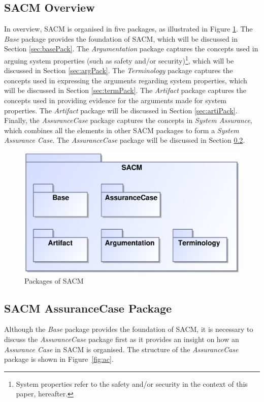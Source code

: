 \subsection{SACM Overview}
In overview, SACM is organised in five packages, as illustrated in Figure \ref{fig:overview}. The \textit{Base} package provides the foundation of SACM, which will be discussed in Section \ref{sec:basePack}. The \textit{Argumentation} package captures the concepts used in arguing system properties (such as safety and/or security)\footnote{System properties refer to the safety and/or security in the context of this paper, hereafter.}, which will be discussed in Section \ref{sec:argPack}. The \textit{Terminology} package captures the concepts used in expressing the arguments regarding system properties, which will be discussed in Section \ref{sec:termPack}. The \textit{Artifact} package captures the concepts used in providing evidence for the arguments made for system properties. The \textit{Artifact} package will be discussed in Section \ref{sec:artiPack}. Finally, the \textit{AssuranceCase} package captures the concepts in \textit{System Assurance}, which combines all the elements in other SACM packages to form a \textit{System Assurance Case}. The \textit{AssuranceCase} package will be discussed in Section \ref{sec:acPack}.

\begin{figure}
	\centering
	\includegraphics[width=0.6\linewidth]{fig/Overview.eps}
	\caption{Packages of SACM}
	\label{fig:overview}
\end{figure}

\subsection{SACM AssuranceCase Package}
\label{sec:acPack}
Although the \textit{Base} package provides the foundation of SACM, it is necessary to discuss the \textit{AssuranceCase} package first as it provides an insight on how an \textit{Assurance Case} in SACM is organised. The structure of the \textit{AssuranceCase} package is shown in Figure~\ref{fig:ac}.

